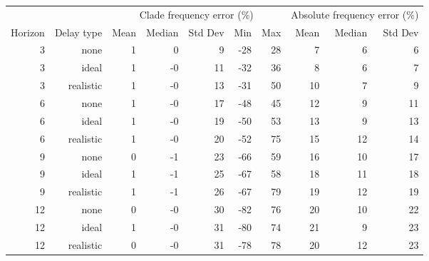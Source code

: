 
\begin{tabular*}{1.0\textwidth}{rrrrrrrrrr}
\toprule
        &            & \multicolumn{5}{c}{Clade frequency error (\%)} & \multicolumn{3}{c}{Absolute frequency error (\%)} \\
Horizon & Delay type & Mean & Median & Std Dev & Min & Max & Mean & Median & Std Dev \\
\midrule

3 & none & 1 & 0 & 9 & -28 & 28 & 7 & 6 & 6 \\
3 & ideal & 1 & -0 & 11 & -32 & 36 & 8 & 6 & 7 \\
3 & realistic & 1 & -0 & 13 & -31 & 50 & 10 & 7 & 9 \\
6 & none & 1 & -0 & 17 & -48 & 45 & 12 & 9 & 11 \\
6 & ideal & 1 & -0 & 19 & -50 & 53 & 13 & 9 & 13 \\
6 & realistic & 1 & -0 & 20 & -52 & 75 & 15 & 12 & 14 \\
9 & none & 0 & -1 & 23 & -66 & 59 & 16 & 10 & 17 \\
9 & ideal & 1 & -1 & 25 & -67 & 58 & 18 & 11 & 18 \\
9 & realistic & 1 & -1 & 26 & -67 & 79 & 19 & 12 & 19 \\
12 & none & 0 & -0 & 30 & -82 & 76 & 20 & 10 & 22 \\
12 & ideal & 1 & -0 & 31 & -80 & 74 & 21 & 9 & 23 \\
12 & realistic & 0 & -0 & 31 & -78 & 78 & 20 & 12 & 23 \\

\bottomrule
\end{tabular*}


